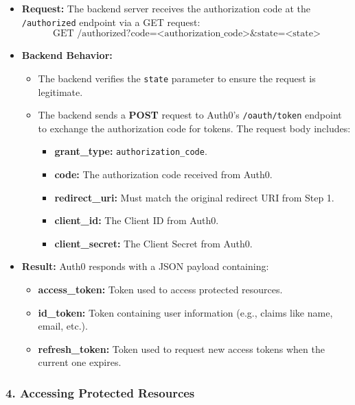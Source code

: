 \documentclass[11pt]{article}
\begin{document}
\begin{itemize}
    \item \textbf{Request:} The backend server receives the authorization code at the \texttt{/authorized} endpoint via a GET request:
    \[
    \text{GET /authorized?code=<authorization\_code>&state=<state>}
    \]
    \item \textbf{Backend Behavior:}
          \begin{itemize}
              \item The backend verifies the \texttt{state} parameter to ensure the request is legitimate.
              \item The backend sends a \textbf{POST} request to Auth0's \texttt{/oauth/token} endpoint to exchange the authorization code for tokens. The request body includes:
              \begin{itemize}
                  \item \textbf{grant\_type:} \texttt{authorization\_code}.
                  \item \textbf{code:} The authorization code received from Auth0.
                  \item \textbf{redirect\_uri:} Must match the original redirect URI from Step 1.
                  \item \textbf{client\_id:} The Client ID from Auth0.
                  \item \textbf{client\_secret:} The Client Secret from Auth0.
              \end{itemize}
          \end{itemize}
    \item \textbf{Result:} Auth0 responds with a JSON payload containing:
          \begin{itemize}
              \item \textbf{access\_token:} Token used to access protected resources.
              \item \textbf{id\_token:} Token containing user information (e.g., claims like name, email, etc.).
              \item \textbf{refresh\_token:} Token used to request new access tokens when the current one expires.
          \end{itemize}
\end{itemize}

\subsubsection*{4. \textbf{Accessing Protected Resources}}
\end{document}
